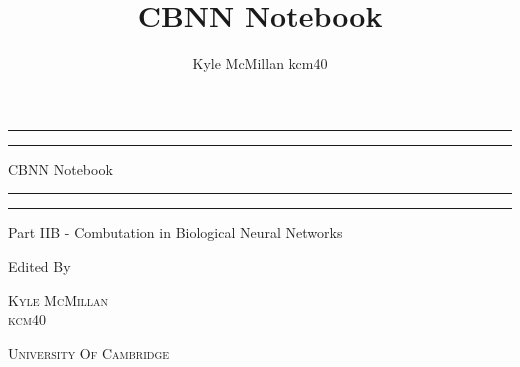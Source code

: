 \documentclass[a4paper, 11pt, oneside]{report}
\author{Kyle McMillan kcm40}
\title{CBNN Notebook}
\begin{document}

\begin{titlepage}
    \centering %
	
	\scshape %
	
	\vspace*{\baselineskip} %
	
	\rule{\textwidth}{1.6pt}\vspace*{-\baselineskip}\vspace*{2pt} %
	\rule{\textwidth}{0.4pt} %
	
	\vspace{0.75\baselineskip} %
	
	{\LARGE CBNN Notebook} %
	
	\vspace{0.75\baselineskip} %
	
	\rule{\textwidth}{0.4pt}\vspace*{-\baselineskip}\vspace{3.2pt} %
	\rule{\textwidth}{1.6pt} %
	
	\vspace{2\baselineskip} %
	
	
	Part IIB - Combutation in Biological Neural Networks %
	
	\vspace*{3\baselineskip} %
	
	
	Edited By
	
	\vspace{0.5\baselineskip} %
	
	{\scshape\Large Kyle McMillan \\ kcm40} %
	
	\vspace{0.5\baselineskip} %
	
    \textsc{University Of Cambridge} %
	
	\vfill %

\end{titlepage}
\end{document}
